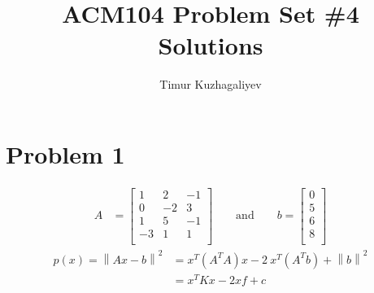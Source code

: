 \documentclass[10pt,letter]{article}
\newcommand\norm[1]{\left\lVert#1\right\rVert}
\begin{document}
\title{ACM104 Problem Set \#4 Solutions}

\author{Timur Kuzhagaliyev}

 
\maketitle 

\section*{Problem 1}

\begin{align*}
A &=
\left[ {\begin{array}{ccc}
 1 &  2 & -1 \\
 0 &  -2 & 3 \\
 1 &  5 & -1 \\
 -3 &  1 & 1 \\
\end{array} } \right]
\qquad \textrm{and} \qquad
b = 
\left[ {\begin{array}{c}
 0 \\
 5 \\
 6 \\
 8 \\
\end{array} } \right]
\end{align*}
\begin{align*}
p(x) = \norm{Ax-b}^2 &= x^T (A^T A) x - 2\ x^T (A^T b) + \norm{b}^2
\\ &= x^T K x - 2 x f + c 
\end{align*}
\end{document}
